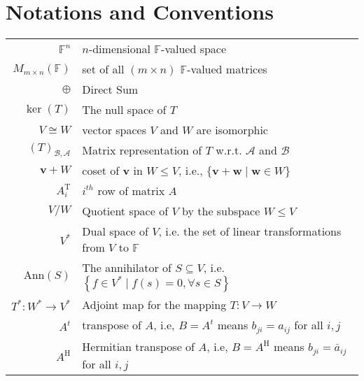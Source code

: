 \chapter*{Notations and Conventions}


\begin{tabular}{rl}
\({\mathbb{F}}^n\) & \(n\)-dimensional \(\mathbb{F}\)-valued space\\

 \({M}_{m \times  n}\left( \mathbb{F}\right)\) &set of all \((m \times  n)\) \(\mathbb{F}\)-valued matrices\\

 \(\oplus  \) & Direct Sum \\

 \(\ker \left( T\right) \) & The null space of \(T\)\\

 \(V \cong  W\) & vector spaces \(V\) and \(W\) are isomorphic\\

 \({\left( T\right) }_{\mathcal{B},\mathcal{A}}\) & Matrix representation of \(T\) w.r.t. \(\mathcal{A}\) and \(\mathcal{B}\)\\

 \(\mathbf{v} + W\) & coset of \(\mathbf{v}\) in $W \leq V$, i.e., \(\{ \mathbf{v} + \mathbf{w} \mid  \mathbf{w} \in  W\}\)\\

 \({A}_{i}^{\mathrm{T}}\)& \(i^{th}\) row of matrix \(A\)\\

  \(V/W\) & Quotient space of \(V\) by the subspace \(W \leq V\)\\

  \(V^*\)& Dual space of \(V\), i.e. the set of linear transformations from \(V\) to \(\mathbb{F}\)\\

  \(\mathrm{Ann}\left( S\right) \) & The annihilator of \(S \subseteq  V\), i.e. \(\left\{  {f \in  {V}^{ * } \mid  f\left( s\right)  = 0,\forall s \in  S}\right\}\)\\

 \({T}^{ * } : {W}^{ * } \rightarrow  {V}^{ * }\) & Adjoint map  for the mapping \(T : V \rightarrow  W\)\\

\(A^t\) & transpose of \(A\), i.e, \(B = A^t\) means \({b}_{ji} = {{a}}_{ij}\) for all \(i,j\)\\

 \(A^{\mathrm{H}}\) & Hermitian transpose of \(A\), i.e, \(B = A^{\mathrm{H}}\) means \({b}_{ji} = {\bar{a}}_{ij}\) for all \(i,j\)\\


\end{tabular}
